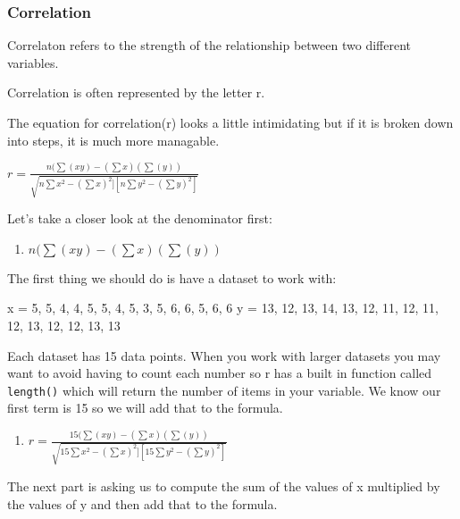 \documentclass[]{article}
\title{}
\author{}
\date{}
\providecommand{\tightlist}{%
  \setlength{\itemsep}{0pt}\setlength{\parskip}{0pt}}
\begin{document}
{
\setcounter{tocdepth}{1}
\tableofcontents
}
\subsubsection{Correlation}\label{correlation}

Correlaton refers to the strength of the relationship between two
different variables.

Correlation is often represented by the letter r.

The equation for correlation(r) looks a little intimidating but if it is
broken down into steps, it is much more managable.

\(r = \frac{n(\sum(xy)-(\sum x)(\sum(y))}{\sqrt{n \sum x ^2-(\sum x)^2][n \sum y ^2-(\sum y)^2]}}\)

Let's take a closer look at the denominator first:

\begin{enumerate}
\def\labelenumi{\arabic{enumi}.}
\tightlist
\item
  \(n(\sum(xy)-(\sum x)(\sum(y))\)
\end{enumerate}

The first thing we should do is have a dataset to work with:

x = 5, 5, 4, 4, 5, 5, 4, 5, 3, 5, 6, 6, 5, 6, 6 y = 13, 12, 13, 14, 13,
12, 11, 12, 11, 12, 13, 12, 12, 13, 13

Each dataset has 15 data points. When you work with larger datasets you
may want to avoid having to count each number so r has a built in
function called \texttt{length()} which will return the number of items
in your variable. We know our first term is 15 so we will add that to
the formula.

\begin{enumerate}
\def\labelenumi{\arabic{enumi}.}
\setcounter{enumi}{1}
\tightlist
\item
  \(r = \frac{15(\sum(xy)-(\sum x)(\sum(y))}{\sqrt{15 \sum x ^2-(\sum x)^2][15 \sum y ^2-(\sum y)^2]}}\)
\end{enumerate}

The next part is asking us to compute the sum of the values of x
multiplied by the values of y and then add that to the formula.
\end{document}
